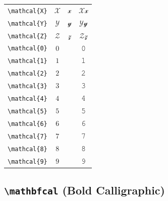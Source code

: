 \documentclass[12pt,a4paper]{article}
\begin{document}
\begin{longtable}{|c|c|c|c|}
\verb|\mathcal{X}| & $\mathcal{X}$ & $\mathcal{x}$ & $ 𝒳 𝓍 $ \\
\verb|\mathcal{Y}| & $\mathcal{Y}$ & $\mathcal{y}$ & $ 𝒴 𝓎 $ \\
\verb|\mathcal{Z}| & $\mathcal{Z}$ & $\mathcal{z}$ & $ 𝒵 𝓏 $ \\
\verb|\mathcal{0}| & $\mathcal{0}$ & & 𝟶 \\
\verb|\mathcal{1}| & $\mathcal{1}$ & & 𝟷 \\
\verb|\mathcal{2}| & $\mathcal{2}$ & & 𝟸 \\
\verb|\mathcal{3}| & $\mathcal{3}$ & & 𝟹 \\
\verb|\mathcal{4}| & $\mathcal{4}$ & & 𝟺 \\
\verb|\mathcal{5}| & $\mathcal{5}$ & & 𝟻 \\
\verb|\mathcal{6}| & $\mathcal{6}$ & & 𝟼 \\
\verb|\mathcal{7}| & $\mathcal{7}$ & & 𝟽 \\
\verb|\mathcal{8}| & $\mathcal{8}$ & & 𝟾 \\
\verb|\mathcal{9}| & $\mathcal{9}$ & & 𝟿 \\
\hline
\end{longtable}

\newpage

\subsection*{\texttt{\textbackslash{}mathbfcal} (Bold Calligraphic)}
\end{document}
